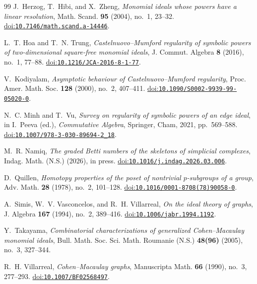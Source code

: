 \documentclass[11pt]{amsart}
\theoremstyle{definition}
\newcommand{\doi}[1]{\href{https://doi.org/#1}{doi:\nolinkurl{#1}}}
\begin{document}
\begin{thebibliography}{99}
J.~Herzog, T.~Hibi, and X.~Zheng,
\emph{Monomial ideals whose powers have a linear resolution},
Math. Scand. \textbf{95} (2004), no.~1, 23--32.
\doi{10.7146/math.scand.a-14446}.

L.~T. Hoa and T.~N. Trung,
\emph{Castelnuovo--Mumford regularity of symbolic powers of two-dimensional square-free monomial ideals},
J. Commut. Algebra \textbf{8} (2016), no.~1, 77--88.
\doi{10.1216/JCA-2016-8-1-77}.

V.~Kodiyalam,
\emph{Asymptotic behaviour of Castelnuovo--Mumford regularity},
Proc. Amer. Math. Soc. \textbf{128} (2000), no.~2, 407--411.
\doi{10.1090/S0002-9939-99-05020-0}.

N.~C. Minh and T.~Vu,
\emph{Survey on regularity of symbolic powers of an edge ideal},
in I.~Peeva (ed.), \emph{Commutative Algebra},
Springer, Cham, 2021, pp.~569--588.
\doi{10.1007/978-3-030-89694-2\_18}.

M.~R. Namiq,
\emph{The graded Betti numbers of the skeletons of simplicial complexes},
Indag. Math. (N.S.) (2026), in press.
\doi{10.1016/j.indag.2026.03.006}.

D.~Quillen,
\emph{Homotopy properties of the poset of nontrivial $p$-subgroups of a group},
Adv. Math. \textbf{28} (1978), no.~2, 101--128.
\doi{10.1016/0001-8708(78)90058-0}.

A.~Simis, W.~V. Vasconcelos, and R.~H. Villarreal,
\emph{On the ideal theory of graphs},
J. Algebra \textbf{167} (1994), no.~2, 389--416.
\doi{10.1006/jabr.1994.1192}.

Y.~Takayama,
\emph{Combinatorial characterizations of generalized Cohen--Macaulay monomial ideals},
Bull. Math. Soc. Sci. Math. Roumanie (N.S.) \textbf{48(96)} (2005),
no.~3, 327--344.

R.~H. Villarreal,
\emph{Cohen--Macaulay graphs},
Manuscripta Math. \textbf{66} (1990), no.~3, 277--293.
\doi{10.1007/BF02568497}.

\end{thebibliography}
\end{document}
